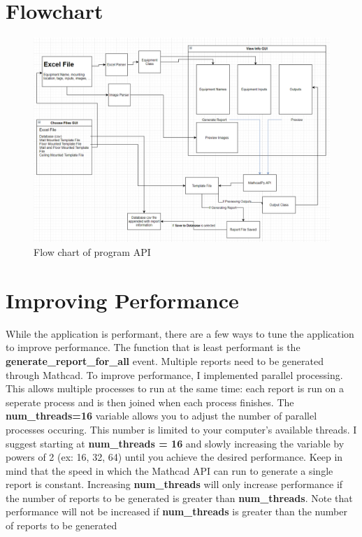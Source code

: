 \documentclass[11pt]{article}
\begin{document}
\section{Flowchart}
\label{sec:org6611239}
\begin{figure}[htbp]
\centering
\includegraphics[width=.9\linewidth]{./dist/documentation/component_flowchart.png}
\caption{\label{fig:org3922dbb}Flow chart of program API}
\end{figure}

\section{Improving Performance}
\label{sec:org395bf22}
While the application is performant, there are a few ways to tune the application to improve performance. The function that is least performant is the \textbf{generate\_report\_for\_all} event. Multiple reports need to be generated through Mathcad. To improve performance, I implemented parallel processing. This allows multiple processes to run at the same time: each report is run on a seperate process and is then joined when each process finishes. The \textbf{num\_threads=16} variable allows you to adjust the number of parallel processes occuring. This number is limited to your computer's available threads. I suggest starting at \textbf{num\_threads = 16} and slowly increasing the variable by powers of 2 (ex: 16, 32, 64) until you achieve the desired performance. Keep in mind that the speed in which the Mathcad API can run to generate a single report is constant. Increasing \textbf{num\_threads} will only increase performance if the number of reports to be generated is greater than \textbf{num\_threads}. Note that performance will not be increased if \textbf{num\_threads} is greater than the number of reports to be generated
\end{document}
